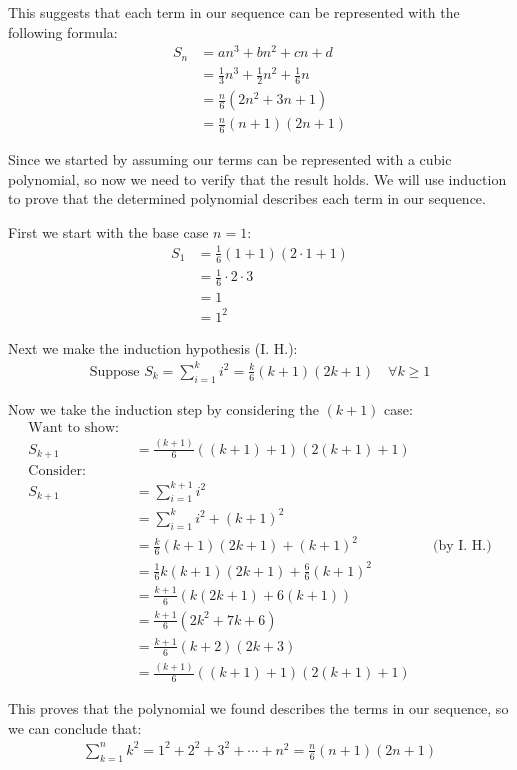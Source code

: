 \documentclass{article}
\begin{document}
This suggests that each term in our sequence can be represented with the following formula:
\[\begin{aligned}
    S_n &= an^3 + bn^2 + cn + d\\
    &= \frac{1}{3}n^3 + \frac{1}{2}n^2 + \frac{1}{6}n \\
    &= \frac{n}{6}(2n^2+3n+1) \\
    &= \frac{n}{6}(n+1)(2n+1)
\end{aligned}\]

Since we started by assuming our terms can be represented with a cubic polynomial, so now we need to verify that the result holds. We will use induction to prove that the determined polynomial describes each term in our sequence.

First we start with the base case \(n=1\):
\[\begin{aligned}
    S_1 &= \frac{1}{6}(1+1)(2\cdot1+1) \\
    &= \frac{1}{6}\cdot2\cdot3 \\
    &= 1 \\
    &= 1^2
\end{aligned}\]

Next we make the induction hypothesis (I. H.):
\[\begin{aligned}
    \text{Suppose } S_k = \sum_{i=1}^{k}i^2 = \frac{k}{6}(k+1)(2k+1) \quad \forall k \geq 1
\end{aligned}\]

Now we take the induction step by considering the \((k+1)\) case:
\[\begin{aligned}
    \text{Want to show: } \\
    S_{k+1} &= \frac{(k+1)}{6}((k+1)+1)(2(k+1)+1) \\
    \text{Consider: } \\
    S_{k+1} &= \sum_{i=1}^{k+1}i^2 \\
    &= \sum_{i=1}^{k}i^2 + (k+1)^2 \\
    &= \frac{k}{6}(k+1)(2k+1) + (k+1)^2 && \text{(by I. H.)} \\
    &= \frac{1}{6}k(k+1)(2k+1)+\frac{6}{6}(k+1)^2 \\
    &= \frac{k+1}{6}(k(2k+1)+6(k+1)) \\
    &= \frac{k+1}{6}(2k^2+7k+6) \\
    &= \frac{k+1}{6}(k+2)(2k+3) \\
    &= \frac{(k+1)}{6}((k+1)+1)(2(k+1)+1)
\end{aligned}\]

This proves that the polynomial we found describes the terms in our sequence, so we can conclude that:
\[\begin{aligned}
    \sum_{k=1}^{n}k^2 = 1^2 + 2^2 + 3^2 + \cdots + n^2 = \frac{n}{6}(n+1)(2n+1)
\end{aligned}\]
\end{document}
